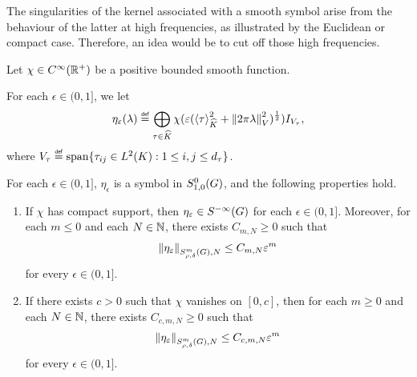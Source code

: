 The singularities of the kernel associated with a smooth symbol
arise from the behaviour of the latter at high frequencies,
as illustrated by the Euclidean or compact case.
Therefore, an idea would be to cut off those high frequencies.

\begin{theorem}
\label{theorem:generalised_Littlewood-Paley_decomposition}
    Let $\chi \in \SmoothFunctions {\R^+}$ be a positive bounded smooth function.

    For each $\epsilon \in (0, 1]$,
    we let
    \begin{align*}
        \eta_\epsilon(\lambda)
        \defeq
        \bigoplus_{\tau \in \dualGroup \CompactGroup} \chi(\epsilon(\JapaneseBracket \CompactGroup \tau^2 + \norm {\turn \lambda}^2)^{\frac 1 2}) \Id {V_\tau},
    \end{align*}
    where $V_\tau \defeq \Span \{\tau_{i j} \in \Lebesgue 2 \CompactGroup : 1 \leq i, j \leq \dimRep \tau\}$.

    For each $\epsilon \in (0, 1]$,
    $\eta_\epsilon$ is a symbol in $\SymbolClass 0 {1, 0}$,
    and the following properties hold.

    \begin{enumerate}
        \item \label{item:generalised_Littlewood-Paley_decomposition:negative_m}
            If $\chi$ has compact support, then $\eta_\epsilon \in \SmoothingSymbols$ for each $\epsilon \in (0, 1]$.
            Moreover, for each $m \leq 0$ and each $N \in \N$,
            there exists $C_{m, N} \geq 0$ such that
            \begin{align*}
                \SymbolSemiNorm m {\rho, \delta} N {\eta_\epsilon} \leq C_{m, N} \epsilon^m
            \end{align*}
            for every $\epsilon \in (0, 1]$.
        \item \label{item:generalised_Littlewood-Paley_decomposition:positive_m}
            If there exists $c > 0$ such that $\chi$ vanishes on $[0, c]$,
            then for each $m \geq 0$ and each $N \in \N$,
            there exists $C_{c, m, N} \geq 0$ such that
            \begin{align*}
                \SymbolSemiNorm m {\rho, \delta} N {\eta_\epsilon} \leq C_{c, m, N} \epsilon^m
            \end{align*}
            for every $\epsilon \in (0, 1]$.
    \end{enumerate}
\end{theorem}
